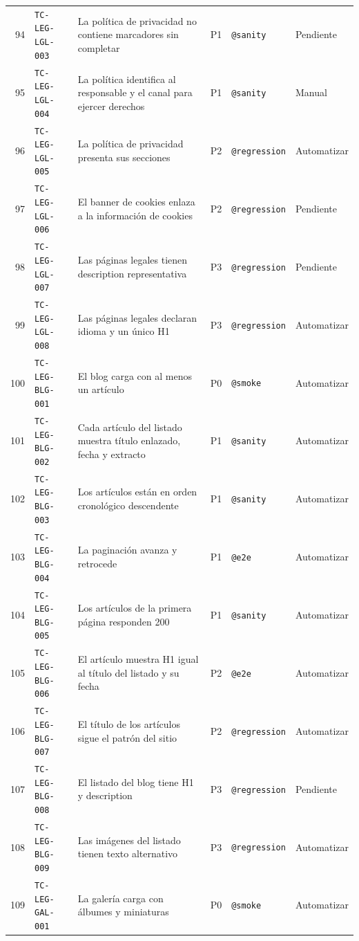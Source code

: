 \documentclass[11pt,a4paper]{article}
\newcommand{\tcid}[1]{\texttt{#1}}
\begin{document}
{\begin{xltabular}{\textwidth}{@{}r l X c l l@{}}
94 & \tcid{TC-LEG-LGL-003} & La política de privacidad no contiene marcadores sin completar & P1 & \texttt{@sanity} & Pendiente \\
95 & \tcid{TC-LEG-LGL-004} & La política identifica al responsable y el canal para ejercer derechos & P1 & \texttt{@sanity} & Manual \\
96 & \tcid{TC-LEG-LGL-005} & La política de privacidad presenta sus secciones & P2 & \texttt{@regression} & Automatizar \\
97 & \tcid{TC-LEG-LGL-006} & El banner de cookies enlaza a la información de cookies & P2 & \texttt{@regression} & Pendiente \\
98 & \tcid{TC-LEG-LGL-007} & Las páginas legales tienen description representativa & P3 & \texttt{@regression} & Pendiente \\
99 & \tcid{TC-LEG-LGL-008} & Las páginas legales declaran idioma y un único H1 & P3 & \texttt{@regression} & Automatizar \\
100 & \tcid{TC-LEG-BLG-001} & El blog carga con al menos un artículo & P0 & \texttt{@smoke} & Automatizar \\
101 & \tcid{TC-LEG-BLG-002} & Cada artículo del listado muestra título enlazado, fecha y extracto & P1 & \texttt{@sanity} & Automatizar \\
102 & \tcid{TC-LEG-BLG-003} & Los artículos están en orden cronológico descendente & P1 & \texttt{@sanity} & Automatizar \\
103 & \tcid{TC-LEG-BLG-004} & La paginación avanza y retrocede & P1 & \texttt{@e2e} & Automatizar \\
104 & \tcid{TC-LEG-BLG-005} & Los artículos de la primera página responden 200 & P1 & \texttt{@sanity} & Automatizar \\
105 & \tcid{TC-LEG-BLG-006} & El artículo muestra H1 igual al título del listado y su fecha & P2 & \texttt{@e2e} & Automatizar \\
106 & \tcid{TC-LEG-BLG-007} & El título de los artículos sigue el patrón del sitio & P2 & \texttt{@regression} & Automatizar \\
107 & \tcid{TC-LEG-BLG-008} & El listado del blog tiene H1 y description & P3 & \texttt{@regression} & Pendiente \\
108 & \tcid{TC-LEG-BLG-009} & Las imágenes del listado tienen texto alternativo & P3 & \texttt{@regression} & Automatizar \\
109 & \tcid{TC-LEG-GAL-001} & La galería carga con álbumes y miniaturas & P0 & \texttt{@smoke} & Automatizar \\

\end{xltabular}}
\end{document}
